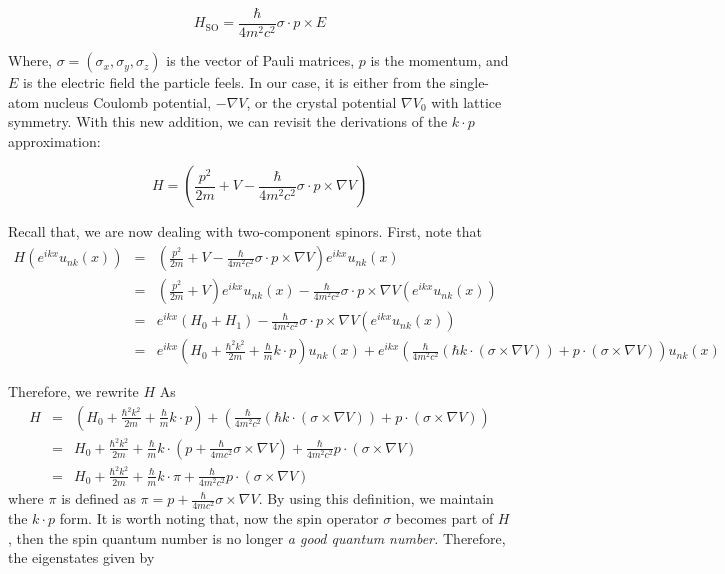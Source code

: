 \documentclass{article}
\begin{document}
\begin{equation}
    H_{\text{SO}} =  \frac{\hbar}{4 m^2 c^2} \sigma \cdot p \times E
\end{equation}

Where, $\sigma = (\sigma_x,\sigma_y,\sigma_z)$ is the vector of Pauli matrices, $p$ is the momentum, and $E$ is  the electric field the particle feels. In our case, it is either from the single-atom nucleus Coulomb potential, $-\nabla V$, or the crystal potential $\nabla V_0$ with lattice symmetry. 
With this new addition, we can revisit the derivations of the $k \cdot p$ approximation:

\begin{equation}
    H = \left( \frac{p^2}{2 m} + V - \frac{\hbar}{4 m^2 c^2} \sigma \cdot p \times\nabla V \right)
\end{equation}

Recall that, we are now dealing with two-component spinors. First, note that
\begin{eqnarray*}  H (e^{i k x} u_{n k} (x)) & = & \left( \frac{p^2}{2 m} + V - \frac{\hbar}{4  m^2 c^2} \sigma \cdot p \times \nabla V \right) e^{i k x} u_{n k} (x)\\  & = & \left( \frac{p^2}{2 m} + V \right) e^{i k x} u_{n k} (x) -  \frac{\hbar}{4 m^2 c^2} \sigma \cdot p \times \nabla V (e^{i k x} u_{n k}  (x))\\  & = & e^{i k x} (H_0 + H_1) - \frac{\hbar}{4 m^2 c^2} \sigma \cdot p \times  \nabla V (e^{i k x} u_{n k} (x))\\  & = & e^{i k x} \left( H_0 + \frac{\hbar^2 k^2}{2 m} + \frac{\hbar}{m} k  \cdot p \right) u_{n k} (x) + e^{i k x} \left( \frac{\hbar}{4 m^2 c^2}   (\hbar k \cdot (\sigma \times \nabla V)) +  p \cdot (\sigma \times  \nabla V) \right) u_{n k} (x)\end{eqnarray*}

Therefore, we rewrite $H$ As
\begin{eqnarray*}  H & = & \left( H_0 + \frac{\hbar^2 k^2}{2 m} + \frac{\hbar}{m} k \cdot p  \right) + \left( \frac{\hbar}{4 m^2 c^2}  (\hbar k \cdot (\sigma \times  \nabla V)) + p \cdot (\sigma \times \nabla V) \right)\\  & = & H_0 + \frac{\hbar^2 k^2}{2 m} + \frac{\hbar}{m} k \cdot \left( p +  \frac{\hbar}{4 m c^2} \sigma \times \nabla V \right) + \frac{\hbar}{4 m^2  c^2} p \cdot (\sigma \times \nabla V)\\  & = & H_0 + \frac{\hbar^2 k^2}{2 m} + \frac{\hbar}{m} k \cdot \pi +  \frac{\hbar}{4 m^2 c^2} p \cdot (\sigma \times \nabla V)\end{eqnarray*}
where $\pi$ is defined as $\pi = p + \frac{\hbar}{4 m c^2} \sigma \times \nabla V$. By using this definition, we maintain the $k \cdot p$ form.
It is worth noting that, now the spin operator $\sigma$ becomes part of $H$, then the spin quantum number is no longer \textit{a good quantum number.} Therefore, the eigenstates given by
\end{document}
